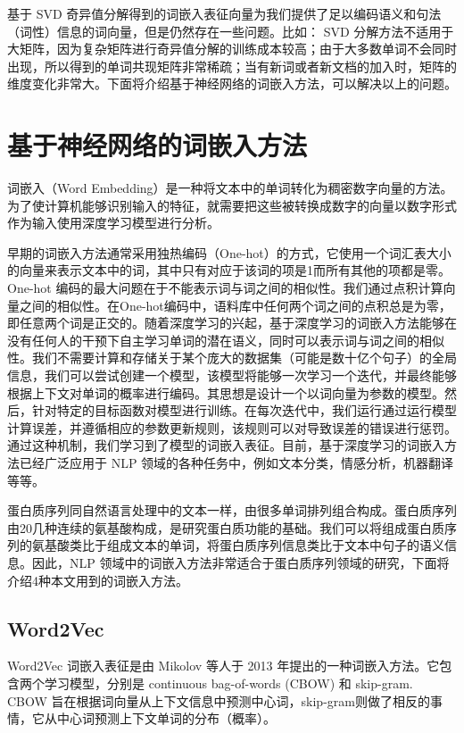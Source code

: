 基于 SVD 奇异值分解得到的词嵌入表征向量为我们提供了足以编码语义和句法（词性）信息的词向量，但是仍然存在一些问题。比如： SVD 分解方法不适用于大矩阵，因为复杂矩阵进行奇异值分解的训练成本较高；由于大多数单词不会同时出现，所以得到的单词共现矩阵非常稀疏；当有新词或者新文档的加入时，矩阵的维度变化非常大。下面将介绍基于神经网络的词嵌入方法，可以解决以上的问题。

\section{基于神经网络的词嵌入方法}
词嵌入（Word Embedding）是一种将文本中的单词转化为稠密数字向量的方法。为了使计算机能够识别输入的特征，就需要把这些被转换成数字的向量以数字形式作为输入使用深度学习模型进行分析。

早期的词嵌入方法通常采用独热编码（One-hot）的方式，它使用一个词汇表大小的向量来表示文本中的词，其中只有对应于该词的项是1而所有其他的项都是零。One-hot 编码的最大问题在于不能表示词与词之间的相似性。我们通过点积计算向量之间的相似性。在One-hot编码中，语料库中任何两个词之间的点积总是为零，即任意两个词是正交的。随着深度学习的兴起，基于深度学习的词嵌入方法能够在没有任何人的干预下自主学习单词的潜在语义，同时可以表示词与词之间的相似性。我们不需要计算和存储关于某个庞大的数据集（可能是数十亿个句子）的全局信息，我们可以尝试创建一个模型，该模型将能够一次学习一个迭代，并最终能够根据上下文对单词的概率进行编码。其思想是设计一个以词向量为参数的模型。然后，针对特定的目标函数对模型进行训练。在每次迭代中，我们运行通过运行模型计算误差，并遵循相应的参数更新规则，该规则可以对导致误差的错误进行惩罚。通过这种机制，我们学习到了模型的词嵌入表征。目前，基于深度学习的词嵌入方法已经广泛应用于 NLP 领域的各种任务中，例如文本分类，情感分析，机器翻译等等。

蛋白质序列同自然语言处理中的文本一样，由很多单词排列组合构成。蛋白质序列由20几种连续的氨基酸构成，是研究蛋白质功能的基础。我们可以将组成蛋白质序列的氨基酸类比于组成文本的单词，将蛋白质序列信息类比于文本中句子的语义信息。因此，NLP 领域中的词嵌入方法非常适合于蛋白质序列领域的研究，下面将介绍4种本文用到的词嵌入方法。

\subsection{Word2Vec}
Word2Vec \cite{mikolov2013distributed} 词嵌入表征是由 Mikolov 等人于 2013 年提出的一种词嵌入方法。它包含两个学习模型，分别是 continuous bag-of-words (CBOW) 和 skip-gram. CBOW 旨在根据词向量从上下文信息中预测中心词，skip-gram则做了相反的事情，它从中心词预测上下文单词的分布（概率）。

